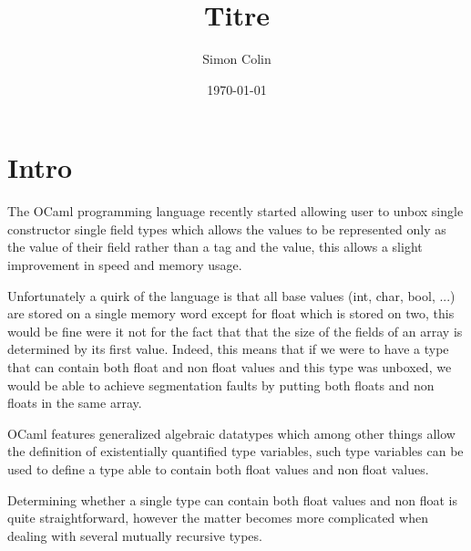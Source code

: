 \documentclass[a4]{article}
\title{Titre}
\author{Simon Colin}
\date{\today}
\begin{document}
\maketitle


\section{Intro}

The OCaml programming language recently started allowing user to unbox single constructor single field types which allows the values to be represented only as the value of their field rather than a tag and the value, this allows a slight improvement in speed and memory usage.


Unfortunately a quirk of the language is that all base values (int, char, bool, ...) are stored on a single memory word except for float which is stored on two, this would be fine were it not for the fact that that the size of the fields of an array is determined by its first value. Indeed, this means that if we were to have a type that can contain both float and non float values and this type was unboxed, we would be able to achieve segmentation faults by putting both floats and non floats in the same array.


OCaml features generalized algebraic datatypes which among other things allow the definition of existentially quantified type variables, such type variables can be used to define a type able to contain both float values and non float values.


Determining whether a single type can contain both float values and non float is quite straightforward, however the matter becomes more complicated when dealing with several mutually recursive types.
\end{document}
